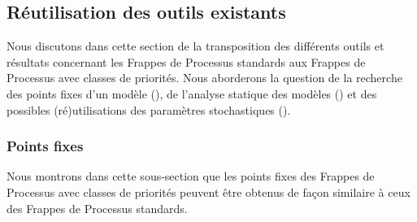 \subsection{Réutilisation des outils existants}



Nous discutons dans cette section de la transposition des différents outils et
résultats concernant les Frappes de Processus standards
aux Frappes de Processus avec classes de priorités.
Nous aborderons la question de la recherche des points fixes d'un modèle (),
de l'analyse statique des modèles ()
et des possibles (ré)utilisations des paramètres stochastiques ().

\subsubsection{Points fixes}

Nous montrons dans cette sous-section que les points fixes des Frappes de Processus
avec classes de priorités peuvent être obtenus de façon similaire à ceux
des Frappes de Processus standards.

\myskip

